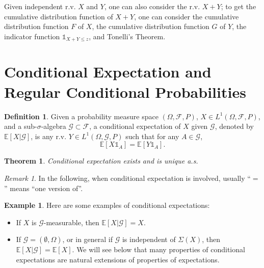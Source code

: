 \documentclass[openany]{book}
\newtheorem{theorem}{Theorem}[chapter]
\theoremstyle{definition}
\newtheorem{definition}{Definition}[chapter]
\newtheorem{example}{Example}[chapter]
\theoremstyle{remark}
\newtheorem*{remark}{Remark}
\begin{document}
Given independent r.v. $X$ and $Y$, one can also consider the r.v. $X+Y$; to get the cumulative distribution function of $X+Y$, one can consider the cumulative distribution function $F$ of $X$, the cumulative distribution function $G$ of $Y$, the indicator function $\mathds{1}_{X+Y\le z}$, and Tonelli's Theorem.

\section{Conditional Expectation and Regular Conditional Probabilities}
\begin{definition}
    Given a probability measure space $(\Omega,\mathcal{F},P)$, $X\in L^1(\Omega,\mathcal{F},P)$, and a sub-$\sigma$-algebra $\mathcal{G}\subset \mathcal{F}$, a conditional expectation of $X$ given $\mathcal{G}$, denoted by $\mathbb{E}[X|\mathcal{G}]$, is any r.v. $Y\in L^1(\Omega,\mathcal{G},P)$ such that for any $A\in \mathcal{G}$,
    \begin{equation}
        \mathbb{E}[X\mathds{1}_A]=\mathbb{E}[Y\mathds{1}_A].
    \end{equation}
\end{definition}
\begin{theorem}
    Conditional expectation exists and is unique a.s.
\end{theorem}
\begin{remark}
    In the following, when conditional expectation is involved, usually ``$=$'' means ``one version of''.
\end{remark}
\begin{example}
    Here are some examples of conditional expectations:
    \begin{itemize}
        \item If $X$ is $\mathcal{G}$-measurable, then $\mathbb{E}[X|\mathcal{G}]=X$.
        \item If $\mathcal{G}=(\emptyset,\Omega)$, or in general if $\mathcal{G}$ is independent of $\Sigma(X)$, then $\mathbb{E}[X|\mathcal{G}]=\mathbb{E}[X]$. We will see below that many properties of conditional expectations are natural extensions of properties of expectations.
    \end{itemize}
\end{example}
\end{document}
